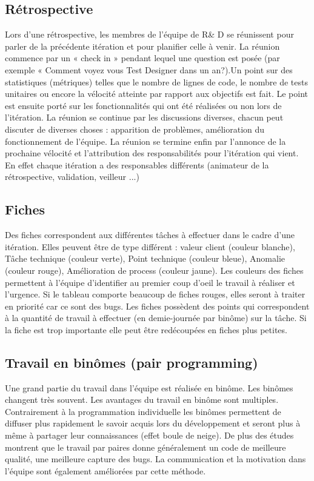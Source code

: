 \documentclass{article}
\begin{document}
\subsection{Rétrospective}
Lors d'une rétrospective,  les membres de l'équipe de R\& D se réunissent pour parler de la précédente itération et pour planifier celle à venir. La réunion commence par un « check in » pendant lequel une question est posée (par exemple « Comment voyez vous Test Designer dans un an?).Un point sur des statistiques (métriques) telles que le nombre de lignes de code, le nombre de tests unitaires ou encore la vélocité atteinte par rapport aux objectifs est fait. Le point est ensuite porté sur les fonctionnalités qui ont été réalisées ou non lors de l'itération. La réunion se continue par les discussions diverses, chacun peut discuter de diverses choses : apparition de problèmes, amélioration du fonctionnement de l'équipe. La réunion se termine enfin par l'annonce de la prochaine vélocité et l'attribution des responsabilités pour l'itération qui vient. En effet chaque itération a des responsables différents (animateur de la rétrospective, validation, veilleur ...)
\subsection{Fiches}
Des fiches correspondent aux différentes t\^aches à effectuer dans le cadre d'une itération. Elles peuvent \^etre de type différent : valeur client (couleur blanche), T\^ache technique (couleur verte), Point technique (couleur bleue), Anomalie (couleur rouge), Amélioration de process (couleur jaune). Les couleurs des fiches permettent à l'équipe d'identifier au premier coup d'oeil le travail à réaliser et l'urgence. Si le tableau comporte beaucoup de fiches rouges, elles seront à traiter en priorité car ce sont des bugs. Les fiches possèdent des points qui correspondent à la quantité de travail à effectuer (en demie-journée par bin\^ome) sur la t\^ache. Si la fiche est trop importante elle peut \^etre redécoupées en fiches plus petites.

\subsection{Travail en binômes (pair programming)}
Une grand partie du travail dans l'équipe est réalisée en binôme. Les binômes changent très souvent. Les avantages du travail en binôme sont multiples. Contrairement à la programmation individuelle les binômes permettent de diffuser plus rapidement le savoir acquis lors du développement et seront plus à même à partager leur connaissances (effet boule de neige). De plus des études montrent que le travail par paires donne généralement un code de meilleure qualité, une meilleure capture des bugs. La communication et la motivation dans l'équipe sont également améliorées par cette méthode.
\end{document}
